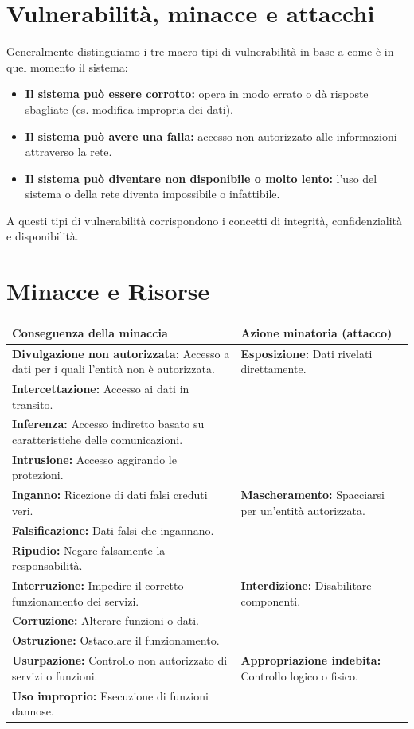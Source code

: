 \documentclass{article}
\begin{document}
\section{Vulnerabilità, minacce e attacchi}
Generalmente distinguiamo i tre macro tipi di vulnerabilità in base a come è in quel momento il sistema:
\begin{itemize}
    \item \textbf{Il sistema può essere corrotto:} opera in modo errato o dà risposte sbagliate (es. modifica impropria dei dati).
    \item \textbf{Il sistema può avere una falla:} accesso non autorizzato alle informazioni attraverso la rete.
    \item \textbf{Il sistema può diventare non disponibile o molto lento:} l'uso del sistema o della rete diventa impossibile o infattibile.
\end{itemize}
A questi tipi di vulnerabilità corrispondono i concetti di integrità, confidenzialità e disponibilità.

\section{Minacce e Risorse}
\begin{table}[h!]
\centering
\small
\begin{tabularx}{\textwidth}{|X|X|}
\hline
\textbf{Conseguenza della minaccia} & \textbf{Azione minatoria (attacco)} \\ \hline
\textbf{Divulgazione non autorizzata:} Accesso a dati per i quali l'entità non è autorizzata. & \textbf{Esposizione:} Dati rivelati direttamente.\\ \textbf{Intercettazione:} Accesso ai dati in transito.\\ \textbf{Inferenza:} Accesso indiretto basato su caratteristiche delle comunicazioni.\\ \textbf{Intrusione:} Accesso aggirando le protezioni. \\ \hline
\textbf{Inganno:} Ricezione di dati falsi creduti veri. & \textbf{Mascheramento:} Spacciarsi per un'entità autorizzata.\\ \textbf{Falsificazione:} Dati falsi che ingannano.\\ \textbf{Ripudio:} Negare falsamente la responsabilità. \\ \hline
\textbf{Interruzione:} Impedire il corretto funzionamento dei servizi. & \textbf{Interdizione:} Disabilitare componenti.\\ \textbf{Corruzione:} Alterare funzioni o dati.\\ \textbf{Ostruzione:} Ostacolare il funzionamento. \\ \hline
\textbf{Usurpazione:} Controllo non autorizzato di servizi o funzioni. & \textbf{Appropriazione indebita:} Controllo logico o fisico.\\ \textbf{Uso improprio:} Esecuzione di funzioni dannose. \\ \hline
\end{tabularx}
\end{table}
\end{document}
